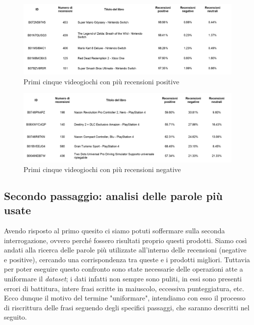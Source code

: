 			\begin{figure} [h]
				\includegraphics[width=\textwidth]{Figure/top_pos_videogames_table}
				\caption{Primi cinque videogiochi con più recensioni positive}
				\label{fig:top_pos_videogames_table}
			\end{figure}
		
			\begin{figure} [h]
				\includegraphics[width=\textwidth]{Figure/top_neg_videogames_table}
				\caption{Primi cinque videogiochi con più recensioni negative}
				\label{fig:top_neg_videogames_table}
			\end{figure}
		
	
		\subsection{Secondo passaggio: analisi delle parole più usate}
			Avendo risposto al primo quesito ci siamo potuti soffermare sulla seconda interrogazione, ovvero perché fossero risultati proprio questi prodotti. Siamo così andati alla ricerca delle parole più utilizzate all'interno delle recensioni (negative e positive), cercando una corrispondenza tra queste e i prodotti migliori. Tuttavia per poter eseguire questo confronto sono state necessarie delle operazioni atte a uniformare il \textit{dataset}; i dati infatti non sempre sono puliti, in essi sono presenti errori di battitura, intere frasi scritte in maiuscolo, eccessiva punteggiatura, etc. Ecco dunque il motivo del termine "uniformare", intendiamo con esso il processo di riscrittura delle frasi seguendo degli specifici passaggi, che saranno descritti nel seguito.
			
